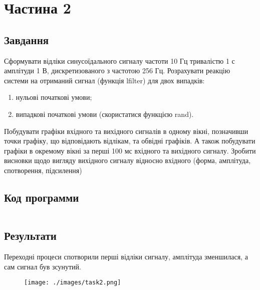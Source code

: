 \section{Частина 2}
\label{sec:task2}

\subsection{Завдання}
\label{subsec:task2_task}

Сформувати відліки синусоїдального сигналу частоти 10 Гц
тривалістю 1 с амплітуди 1 В, дискретизованого з частотою 256 Гц.
Розрахувати реакцію системи на отриманий сигнал (функція lfilter) для двох
випадків:
\begin{enumerate}
    \item нульові початкові умови;
    \item випадкові початкові умови (скористатися функцією rand).
\end{enumerate}
Побудувати графіки вхідного та вихідного
сигналів в одному вікні, позначивши точки графіку, що відповідають відлікам,
та обвідні графіків. А також побудувати графіки в окремому вікні за перші 100
мс вхідного та вихідного сигналу. Зробити висновки щодо вигляду
вихідного сигналу відносно вхідного (форма, амплітуда, спотворення,
підсилення)

\subsection{Код программи}
\label{subsec:task2_code}
\inputminted{python}{../src/task2.py}

\subsection{Результати}
\label{subsec:task2_results}

Переходні процеси спотворили перші відліки сигналу,
амплітуда зменшилася, а сам сигнал був зсунутий.

\begin{figure}[!ht]
    \centering
    \texttt{[image: ./images/task2.png]}
\end{figure}
